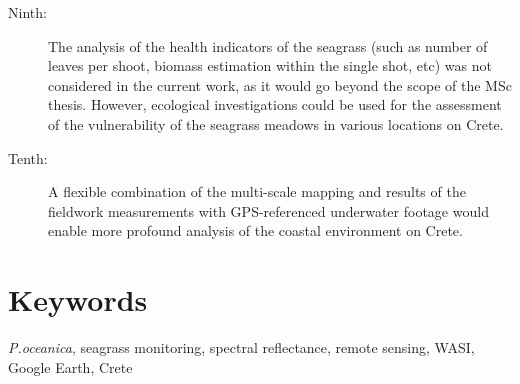 \documentclass[11pt]{article}
\begin{document}
\begin{description}
		\item[Ninth:] The analysis of the health indicators of the seagrass (such as number of leaves per shoot, biomass estimation within the single shot, etc) was not considered in the current work, as it would go beyond the scope of the MSc thesis. However, ecological investigations could be used for the assessment of the vulnerability of the seagrass meadows in various locations on Crete. 
		\item[Tenth:] A flexible combination of the multi-scale mapping and results of the fieldwork measurements with \ac{GPS}-referenced underwater footage would enable more profound analysis of the coastal environment on Crete. 
	\end{description}

\section*{Keywords}
\textit{P.oceanica}, seagrass monitoring, spectral reflectance, remote sensing, WASI, Google Earth, Crete
\pagebreak
\end{document}
